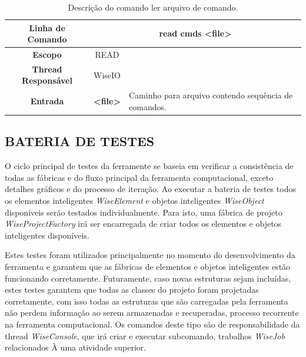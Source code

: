 \begin{center}
	\begin{table}[!htbp]
		\begin{tabular}{|c|c|m{}|}
			\hline
			\textbf{Linha de Comando} & \multicolumn{2}{c|}{read cmds <file>} \\
			\hline
			\textbf{Escopo} & \multicolumn{1}{c|}{READ} \\
			\hline
			\textbf{Thread Responsável} & \multicolumn{1}{c|}{WiseIO} \\
			\hline
			\textbf{Entrada} & \textbf{<file>} & Caminho para arquivo contendo sequência de comandos. \\
			\hline
		\end{tabular}
		\caption{Descrição do comando ler arquivo de comando.}
		\label{tab:read}
	\end{table}
\end{center}

\subsection{BATERIA DE TESTES}\label{sec:test}

O ciclo principal de testes da ferramente se baseia em verificar a consistência de todas as fábricas e do fluxo principal da ferramenta computacional, exceto detalhes gráficos e do processo de iteração. Ao executar a bateria de testes todos os elementos inteligentes \textit{WiseElement} e objetos inteligentes \textit{WiseObject} disponíveis serão testados individualmente. Para isto, uma fábrica de projeto \textit{WiseProjectFactory} irá ser encarregada de criar todos os elementos e objetos inteligentes disponíveis.

Estes testes foram utilizados principalmente no momento do desenvolvimento da ferramenta e garantem que as fábricas de elementos e objetos inteligentes estão funcionando corretamente. Futuramente, caso novas estruturas sejam incluídas, estes testes garantem que todas as classes do projeto foram projetadas corretamente, com isso todas as estruturas que são carregadas pela ferramenta não perdem informação ao serem armazenadas e recuperadas, processo recorrente na ferramenta computacional. Os comandos deste tipo são de responsabilidade da thread \textit{WiseConsole}, que irá criar e executar subcomando, trabalhos \textit{WiseJob} relacionados À uma atividade superior.

